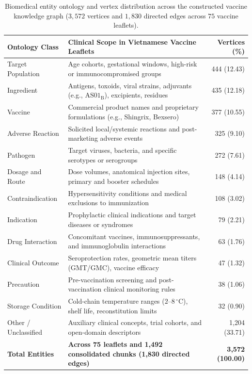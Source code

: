 \documentclass[sn-mathphys, oneside]{sn-jnl}
\begin{document}
\begin{table}[htbp]
\centering
\caption{Biomedical entity ontology and vertex distribution across the constructed vaccine knowledge graph ($3,572$ vertices and $1,830$ directed edges across $75$ vaccine leaflets).}
\label{tab:kg_ontology}
\small
\begin{tabularx}{\linewidth}{lXr}
\toprule
Ontology Class & Clinical Scope in Vietnamese Vaccine Leaflets & Vertices (\%)\\
\midrule
Target Population & Age cohorts, gestational windows, high-risk or immunocompromised groups & 444 (12.43)\\
Ingredient & Antigens, toxoids, viral strains, adjuvants (e.g., $\text{AS01}_{\text{B}}$), excipients, residues & 435 (12.18)\\
Vaccine & Commercial product names and proprietary formulations (e.g., Shingrix, Bexsero) & 377 (10.55)\\
Adverse Reaction & Solicited local/systemic reactions and post-marketing adverse events & 325 (9.10)\\
Pathogen & Target viruses, bacteria, and specific serotypes or serogroups & 272 (7.61)\\
Dosage and Route & Dose volumes, anatomical injection sites, primary and booster schedules & 148 (4.14)\\
Contraindication & Hypersensitivity conditions and medical exclusions to immunization & 108 (3.02)\\
Indication & Prophylactic clinical indications and target diseases or syndromes & 79 (2.21)\\
Drug Interaction & Concomitant vaccines, immunosuppressants, and immunoglobulin interactions & 63 (1.76)\\
Clinical Outcome & Seroprotection rates, geometric mean titers (GMT/GMC), vaccine efficacy & 47 (1.32)\\
Precaution & Pre-vaccination screening and post-vaccination clinical monitoring rules & 38 (1.06)\\
Storage Condition & Cold-chain temperature ranges ($2\text{--}8\,^\circ\text{C}$), shelf life, reconstitution limits & 32 (0.90)\\
Other / Unclassified & Auxiliary clinical concepts, trial cohorts, and open-domain descriptors & 1,204 (33.71)\\
\midrule
\textbf{Total Entities} & \textbf{Across 75 leaflets and 1,492 consolidated chunks (1,830 directed edges)} & \textbf{3,572 (100.00)}\\
\bottomrule
\end{tabularx}
\end{table}
\end{document}
